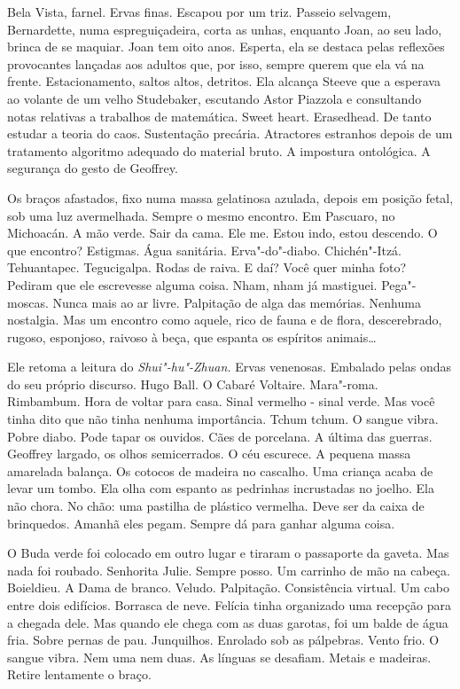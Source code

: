 Bela Vista, farnel. Ervas finas. Escapou por um triz. Passeio selvagem,
Bernardette, numa espreguiçadeira, corta as unhas, enquanto Joan, ao seu
lado, brinca de se maquiar. Joan tem oito anos. Esperta, ela se destaca
pelas reflexões provocantes lançadas aos adultos que, por isso, sempre
querem que ela vá na frente. Estacionamento, saltos altos, detritos. Ela
alcança Steeve que a esperava ao volante de um velho Studebaker,
escutando Astor Piazzola e consultando notas relativas a trabalhos de
matemática. Sweet heart. Erasedhead. De tanto estudar a teoria do caos.
Sustentação precária. Atractores estranhos depois de um tratamento
algoritmo adequado do material bruto. A impostura ontológica. A
segurança do gesto de Geoffrey.

Os braços afastados, fixo numa massa gelatinosa azulada, depois em
posição fetal, sob uma luz avermelhada. Sempre o mesmo encontro. Em
Pascuaro, no Michoacán. A mão verde. Sair da cama. Ele me. Estou indo,
estou descendo. O que encontro? Estigmas. Água sanitária. Erva"-do"-diabo.
Chichén"-Itzá. Tehuantapec. Tegucigalpa. Rodas de raiva. E daí? Você quer
minha foto? Pediram que ele escrevesse alguma coisa. Nham, nham já
mastiguei. Pega"-moscas. Nunca mais ao ar livre. Palpitação de alga das
memórias. Nenhuma nostalgia. Mas um encontro como aquele, rico de fauna
e de flora, descerebrado, rugoso, esponjoso, raivoso à beça, que espanta
os espíritos animais\ldots{}

Ele retoma a leitura do \emph{Shui"-hu"-Zhuan.} Ervas venenosas. Embalado
pelas ondas do seu próprio discurso. Hugo Ball. O Cabaré Voltaire.
Mara"-roma. Rimbambum. Hora de voltar para casa. Sinal vermelho - sinal
verde. Mas você tinha dito que não tinha nenhuma importância. Tchum
tchum. O sangue vibra. Pobre diabo. Pode tapar os ouvidos. Cães de
porcelana. A última das guerras. Geoffrey largado, os olhos
semicerrados. O céu escurece. A pequena massa amarelada balança. Os
cotocos de madeira no cascalho. Uma criança acaba de levar um tombo. Ela
olha com espanto as pedrinhas incrustadas no joelho. Ela não chora. No
chão: uma pastilha de plástico vermelha. Deve ser da caixa de
brinquedos. Amanhã eles pegam. Sempre dá para ganhar alguma coisa.

O Buda verde foi colocado em outro lugar e tiraram o passaporte da
gaveta. Mas nada foi roubado. Senhorita Julie. Sempre posso. Um carrinho
de mão na cabeça. Boieldieu. A Dama de branco. Veludo. Palpitação.
Consistência virtual. Um cabo entre dois edifícios. Borrasca de neve.
Felícia tinha organizado uma recepção para a chegada dele. Mas quando
ele chega com as duas garotas, foi um balde de água fria. Sobre pernas
de pau. Junquilhos. Enrolado sob as pálpebras. Vento frio. O sangue
vibra. Nem uma nem duas. As línguas se desafiam. Metais e madeiras.
Retire lentamente o braço.

